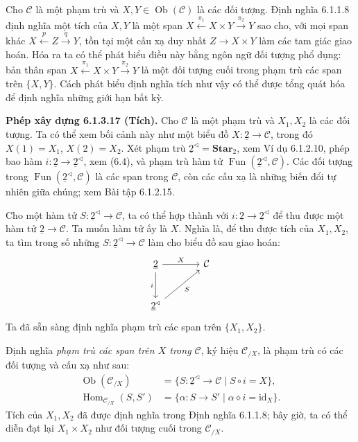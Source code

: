 Cho $\mathcal C$ là một phạm trù và $X,Y\in\operatorname{Ob}(\mathcal C)$ là các đối tượng. Định nghĩa 6.1.1.8 định nghĩa một tích của $X,Y$ là một span $X\xleftarrow{\pi_1}X\times Y\xrightarrow{\pi_2}Y$ sao cho, với mọi span khác $X\xleftarrow pZ\xrightarrow qY$, tồn tại một cấu xạ duy nhất $Z\to X\times Y$ làm các tam giác giao hoán. Hóa ra ta có thể phát biểu điều này bằng ngôn ngữ đối tượng phổ dụng: bản thân span $X\xleftarrow{\pi_1}X\times Y\xrightarrow{\pi_2}Y$ là một đối tượng cuối trong phạm trù các span trên $\{X,Y\}$. Cách phát biểu định nghĩa tích như vậy có thể được tổng quát hóa để định nghĩa những giới hạn bất kỳ.

\noindent\textbf{Phép xây dựng 6.1.3.17 (Tích).} Cho $\mathcal C$ là một phạm trù và $X_1,X_2$ là các đối tượng. Ta có thể xem bối cảnh này như một biểu đồ $X:\underline2\to\mathcal C$, trong đó $X(1)=X_1$, $X(2)=X_2$. Xét phạm trù $\underline2^{\triangleleft}=\mathbf{Star}_2$, xem Ví dụ 6.1.2.10, phép bao hàm $i:\underline2\to\underline2^{\triangleleft}$, xem (6.4), và phạm trù hàm tử $\operatorname{Fun}(\underline2^{\triangleleft},\mathcal C)$. Các đối tượng trong $\operatorname{Fun}(\underline2^{\triangleleft},\mathcal C)$ là các span trong $\mathcal C$, còn các cấu xạ là những biến đổi tự nhiên giữa chúng; xem Bài tập 6.1.2.15.

Cho một hàm tử $S:\underline2^{\triangleleft}\to\mathcal C$, ta có thể hợp thành với $i:\underline2\to\underline2^{\triangleleft}$ để thu được một hàm tử $\underline2\to\mathcal C$. Ta muốn hàm tử ấy là $X$. Nghĩa là, để thu được tích của $X_1,X_2$, ta tìm trong số những $S:\underline2^{\triangleleft}\to\mathcal C$ làm cho biểu đồ sau giao hoán:
\[\begin{tikzcd}[column sep=large,row sep=large]\underline2\arrow[r,"X"]\arrow[d,"i"']&\mathcal C\\\underline2^{\triangleleft}\arrow[ur,"S"']&\end{tikzcd}\]
Ta đã sẵn sàng định nghĩa phạm trù các span trên $\{X_1,X_2\}$.

Định nghĩa \emph{phạm trù các span trên $X$ trong $\mathcal C$}, ký hiệu $\mathcal C_{/X}$, là phạm trù có các đối tượng và cấu xạ như sau:
\begin{equation*}\begin{aligned}
\operatorname{Ob}(\mathcal C_{/X})&=\{S:\underline2^{\triangleleft}\to\mathcal C\mid S\circ i=X\},\\
\operatorname{Hom}_{\mathcal C_{/X}}(S,S')&=\{\alpha:S\to S'\mid\alpha\diamond i=\mathrm{id}_X\}.
\end{aligned}\tag{6.5}\end{equation*}
Tích của $X_1,X_2$ đã được định nghĩa trong Định nghĩa 6.1.1.8; bây giờ, ta có thể diễn đạt lại $X_1\times X_2$ như đối tượng cuối trong $\mathcal C_{/X}$.

